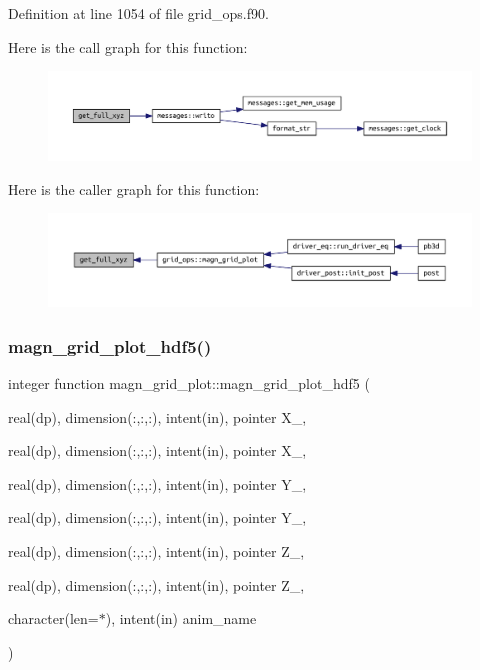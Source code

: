 Definition at line 1054 of file grid\+\_\+ops.\+f90.

Here is the call graph for this function\+:
\nopagebreak
\begin{figure}[H]
\begin{center}
\leavevmode
\includegraphics[width=350pt]{grid__ops_8f90_ab54f19ae54d39ec48cd2602f7ed0e73b_cgraph}
\end{center}
\end{figure}
Here is the caller graph for this function\+:
\nopagebreak
\begin{figure}[H]
\begin{center}
\leavevmode
\includegraphics[width=350pt]{grid__ops_8f90_ab54f19ae54d39ec48cd2602f7ed0e73b_icgraph}
\end{center}
\end{figure}
\mbox{\label{grid__ops_8f90_a7bfbb51880742066ae3add67ee03df2d}} 
\subsubsection{\texorpdfstring{magn\+\_\+grid\+\_\+plot\+\_\+hdf5()}{magn\_grid\_plot\_hdf5()}}
{\footnotesize\ttfamily integer function magn\+\_\+grid\+\_\+plot\+::magn\+\_\+grid\+\_\+plot\+\_\+hdf5 (\begin{DoxyParamCaption}\item[{real(dp), dimension(\+:,\+:,\+:), intent(in), pointer}]{X\+\_,  }\item[{real(dp), dimension(\+:,\+:,\+:), intent(in), pointer}]{X\+\_,  }\item[{real(dp), dimension(\+:,\+:,\+:), intent(in), pointer}]{Y\+\_,  }\item[{real(dp), dimension(\+:,\+:,\+:), intent(in), pointer}]{Y\+\_,  }\item[{real(dp), dimension(\+:,\+:,\+:), intent(in), pointer}]{Z\+\_,  }\item[{real(dp), dimension(\+:,\+:,\+:), intent(in), pointer}]{Z\+\_,  }\item[{character(len=$\ast$), intent(in)}]{anim\+\_\+name }\end{DoxyParamCaption})}



